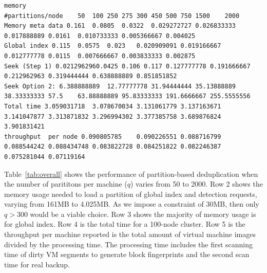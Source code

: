
%

\begin{verbatim}
memory
#partitions/node	50	100	250	275	300	450	500	750	1500	2000
Memory meta data 0.161	0.0805	0.0322	0.029272727	0.026833333	0.017888889	0.0161	0.010733333	0.005366667	0.004025
Global index 0.115	0.0575	0.023	0.020909091	0.019166667	0.012777778	0.0115	0.007666667	0.003833333	0.002875
Seek (Step 1) 0.0212962960.0425 0.106 0.117 0.127777778	0.191666667	0.212962963	0.319444444	0.638888889	0.851851852
Seek Option 2: 6.388888889	12.77777778	31.94444444	35.13888889	38.33333333	57.5	63.88888889	95.83333333	191.6666667	255.5555556
Total time 3.059031718	3.078670034	3.131061779	3.137163671	3.141047877	3.313871832	3.296994302	3.377385758	3.689876824	3.901831421
throughput  per node 0.090805785	0.090226551	0.088716799	0.088544242	0.088434748	0.083822728	0.084251822	0.082246387	0.075281044	0.07119164

\end{verbatim}

Table~\ref{tab:overall} shows the performance of partition-based deduplication when 
the number of parititons per machine ($q$) varies from 50 to 2000.
Row 2 shows the memory usage needed to load a partition of global index and detection requests,
varying from 161MB to 4.025MB. As we impose a constraint of 30MB, then only $q>300$ would be a viable choice.
Row 3 shows the majority of memory usage is for global index.
Row 4 is the total time for a 100-node cluster.
Row 5 is  the throughput per machine reported  is the total 
amount of virtual machine images divided by the processing time. 
The processing time includes the first scanning time
of dirty VM segments to generate block fingerprints and the second scan time for real backup.




